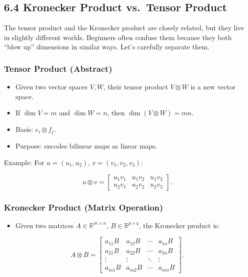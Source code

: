 \documentclass[
  letterpaper,
  DIV=11,
  numbers=noendperiod]{scrreprt}
\providecommand{\tightlist}{%
  \setlength{\itemsep}{0pt}\setlength{\parskip}{0pt}}
\begin{document}
\subsection{6.4 Kronecker Product vs.~Tensor
Product}\label{kronecker-product-vs.-tensor-product}

The tensor product and the Kronecker product are closely related, but
they live in slightly different worlds. Beginners often confuse them
because they both ``blow up'' dimensions in similar ways. Let's
carefully separate them.

\subsubsection{Tensor Product (Abstract)}\label{tensor-product-abstract}

\begin{itemize}
\tightlist
\item
  Given two vector spaces \(V, W\), their tensor product \(V \otimes W\)
  is a new vector space.
\item
  If \(\dim V = m\) and \(\dim W = n\), then \(\dim(V \otimes W) = mn\).
\item
  Basis: \(e_i \otimes f_j\).
\item
  Purpose: encodes bilinear maps as linear maps.
\end{itemize}

Example: For \(u=(u_1,u_2)\), \(v=(v_1,v_2,v_3)\):

\[
u \otimes v =
\begin{bmatrix}
u_1v_1 & u_1v_2 & u_1v_3 \\
u_2v_1 & u_2v_2 & u_2v_3
\end{bmatrix}.
\]

\subsubsection{Kronecker Product (Matrix
Operation)}\label{kronecker-product-matrix-operation}

\begin{itemize}
\tightlist
\item
  Given two matrices \(A \in \mathbb{R}^{m \times n}\),
  \(B \in \mathbb{R}^{p \times q}\), the Kronecker product is:
\end{itemize}

\[
A \otimes B =
\begin{bmatrix}
a_{11}B & a_{12}B & \cdots & a_{1n}B \\
a_{21}B & a_{22}B & \cdots & a_{2n}B \\
\vdots  & \vdots  & \ddots & \vdots \\
a_{m1}B & a_{m2}B & \cdots & a_{mn}B
\end{bmatrix}.
\]
\end{document}
